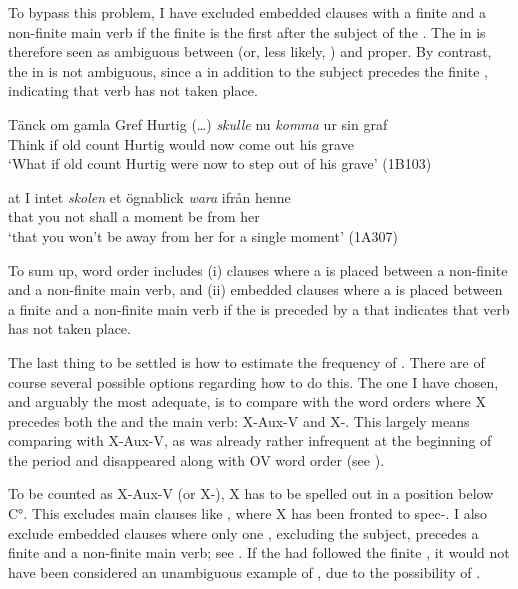 \documentclass[output=paper, colorlinks, citecolor=brown]{langscibook}
\begin{document}
To bypass this problem, I have excluded embedded clauses with a finite  and a non-finite main verb if the finite  is the first  after the subject of the . The  in  is therefore seen as ambiguous between  (or, less likely, ) and  proper. By contrast, the  in  is not ambiguous, since a  in addition to the subject precedes the finite , indicating that verb  has not taken place.


\ea
\label{ex:sangfelt:24}
\ea\label{ex:sangfelt:24a}
\gll Tänck om gamla Gref {Hurtig (…)} \textit{skulle} {nu} \textit{komma} ur sin graf \\ %
 Think if old count Hurtig would now come out his grave\\
\glt ‘What if old count Hurtig were now to step out of his grave’ (1B103)

\ex\label{ex:sangfelt:24b}
\gll at I {intet} \textit{skolen} {et} {ögnablick} \textit{wara} ifrån henne \\
 that you not shall a moment be from her\\
\glt ‘that you won’t be away from her for a single moment’ (1A307)
\z
\z


To sum up,  word order includes (i) clauses where a  is placed between a non-finite  and a non-finite main verb, and (ii) embedded clauses where a  is placed between a finite  and a non-finite main verb if the  is preceded by a  that indicates that verb  has not taken place.


The last thing to be settled is how to estimate the frequency of . There are of course several possible options regarding how to do this. The one I have chosen, and arguably the most adequate, is to compare  with the word orders where X precedes both the  and the main verb: X-Aux-V and X-. This largely means comparing  with X-Aux-V, as  was already rather infrequent at the beginning of the  period and disappeared along with OV word order (see \citealt{Platzack1983,Petzell2011,Sangfelt2019}).



To be counted as X-Aux-V (or X-), X has to be spelled out in a position below C°. This excludes main clauses like , where X has been fronted to spec-. I also exclude embedded clauses where only one , excluding the subject, precedes a finite  and a non-finite main verb; see . If the  had followed the finite , it would not have been considered an unambiguous example of , due to the possibility of .
\end{document}
